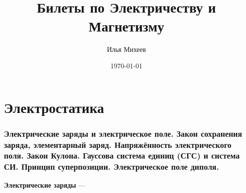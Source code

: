 \documentclass[a4paper,12pt]{article} %
\author{Илья Михеев}
\title{Билеты по Электричеству и Магнетизму}
\date{\today}
\begin{document}

\maketitle 

\part{Электростатика}
\section{Электрические заряды и электрическое поле. Закон сохранения заряда, элементарный заряд. Напряжённость электрического поля. Закон Кулона. Гауссова система единиц (СГС) и система СИ. Принцип суперпозиции. Электрическое поле диполя.}
\textbf{Электрические заряды} --- 
\end{document}

